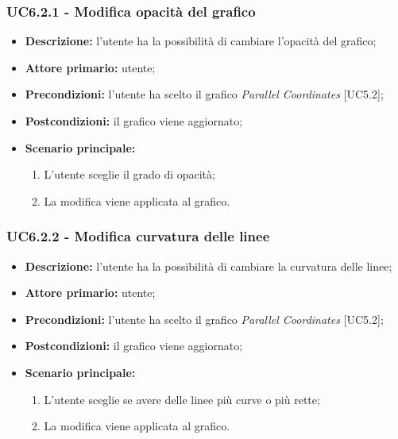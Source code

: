 \subsubsection{UC6.2.1 - Modifica opacità del grafico}
\begin{itemize}
  \item \textbf{Descrizione:} l'utente ha la possibilità di cambiare l'opacità del grafico;
  \item \textbf{Attore primario:} utente;
  \item \textbf{Precondizioni:} l’utente ha scelto il grafico \textit{Parallel Coordinates} [UC5.2];
  \item \textbf{Postcondizioni:} il grafico viene aggiornato;
  \item \textbf{Scenario principale:}
    \begin{enumerate}
    \item L'utente sceglie il grado di opacità;
    \item La modifica viene applicata al grafico.
  \end{enumerate}
\end{itemize}

\subsubsection{UC6.2.2 - Modifica curvatura delle linee}
\begin{itemize}
  \item \textbf{Descrizione:} l'utente ha la possibilità di cambiare la curvatura delle linee;
  \item \textbf{Attore primario:} utente;
  \item \textbf{Precondizioni:} l’utente ha scelto il grafico \textit{Parallel Coordinates} [UC5.2];
  \item \textbf{Postcondizioni:} il grafico viene aggiornato;
  \item \textbf{Scenario principale:}
    \begin{enumerate}
    \item L'utente sceglie se avere delle linee più curve o più rette;
    \item La modifica viene applicata al grafico.
  \end{enumerate}
\end{itemize}

